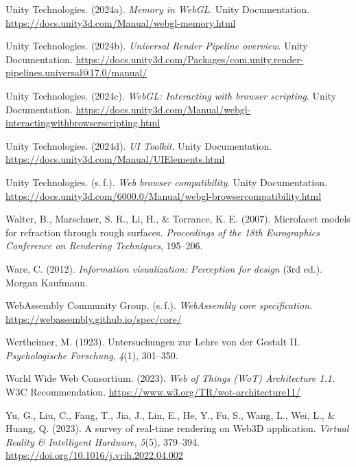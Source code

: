 \begin{list}{}
\item Unity Technologies. (2024a). \textit{Memory in WebGL}. Unity Documentation. \url{https://docs.unity3d.com/Manual/webgl-memory.html}

\item Unity Technologies. (2024b). \textit{Universal Render Pipeline overview}. Unity Documentation. \url{https://docs.unity3d.com/Packages/com.unity.render-pipelines.universal@17.0/manual/}

\item Unity Technologies. (2024c). \textit{WebGL: Interacting with browser scripting}. Unity Documentation. \url{https://docs.unity3d.com/Manual/webgl-interactingwithbrowserscripting.html}

\item Unity Technologies. (2024d). \textit{UI Toolkit}. Unity Documentation. \url{https://docs.unity3d.com/Manual/UIElements.html}

\item Unity Technologies. (s.\,f.). \textit{Web browser compatibility}. Unity Documentation. \url{https://docs.unity3d.com/6000.0/Manual/webgl-browsercompatibility.html}

\item Walter, B., Marschner, S. R., Li, H., \& Torrance, K. E. (2007). Microfacet models for refraction through rough surfaces. \textit{Proceedings of the 18th Eurographics Conference on Rendering Techniques}, 195--206.

\item Ware, C. (2012). \textit{Information visualization: Perception for design} (3rd ed.). Morgan Kaufmann.

\item WebAssembly Community Group. (s.\,f.). \textit{WebAssembly core specification}. \url{https://webassembly.github.io/spec/core/}

\item Wertheimer, M. (1923). Untersuchungen zur Lehre von der Gestalt II. \textit{Psychologische Forschung}, \textit{4}(1), 301--350.

\item World Wide Web Consortium. (2023). \textit{Web of Things (WoT) Architecture 1.1}. W3C Recommendation. \url{https://www.w3.org/TR/wot-architecture11/}

\item Yu, G., Liu, C., Fang, T., Jia, J., Lin, E., He, Y., Fu, S., Wang, L., Wei, L., \& Huang, Q. (2023). A survey of real-time rendering on Web3D application. \textit{Virtual Reality \& Intelligent Hardware}, \textit{5}(5), 379--394. \url{https://doi.org/10.1016/j.vrih.2022.04.002}

\end{list}
